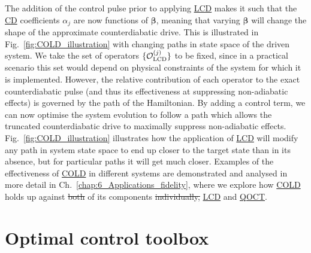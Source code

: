 \documentclass[a4paper,oneside,11pt]{book}
\newcommand{\betabb}{\boldsymbol{\beta}}
\newcommand{\acrref}[1]{\hyperref[acr:#1]{#1}}
\providecommand{\DIFaddtex}[1]{{\protect\color{blue}\uwave{#1}}} %
\providecommand{\DIFdeltex}[1]{{\protect\color{red}\sout{#1}}}                      %
\providecommand{\DIFaddbegin}{} %
\providecommand{\DIFaddend}{} %
\providecommand{\DIFdelbegin}{} %
\providecommand{\DIFdelend}{} %
\providecommand{\DIFadd}[1]{\texorpdfstring{\DIFaddtex{#1}}{#1}} %
\providecommand{\DIFdel}[1]{\texorpdfstring{\DIFdeltex{#1}}{}} %
\newcommand{\DIFscaledelfig}{0.5}
\newlength{\DIFdelgraphicswidth} %
\newlength{\DIFdelgraphicsheight} %
\newcommand{\DIFaddincludegraphics}[2][]{{\color{blue}\fbox{\DIFOincludegraphics[#1]{#2}}}} %
\newcommand{\DIFdelincludegraphics}[2][]{%
\sbox{\DIFdelgraphicsbox}{\DIFOincludegraphics[#1]{#2}}%
\settoboxwidth{\DIFdelgraphicswidth}{\DIFdelgraphicsbox} %
\settoboxtotalheight{\DIFdelgraphicsheight}{\DIFdelgraphicsbox} %
\scalebox{\DIFscaledelfig}{%
\parbox[b]{\DIFdelgraphicswidth}{\usebox{\DIFdelgraphicsbox}\\[-\baselineskip] \rule{\DIFdelgraphicswidth}{0em}}\llap{\resizebox{\DIFdelgraphicswidth}{\DIFdelgraphicsheight}{%
\setlength{\unitlength}{\DIFdelgraphicswidth}%
\begin{picture}(1,1)%
\thicklines\linethickness{2pt} %
{\color[rgb]{1,0,0}\put(0,0){\framebox(1,1){}}}%
{\color[rgb]{1,0,0}\put(0,0){\line( 1,1){1}}}%
{\color[rgb]{1,0,0}\put(0,1){\line(1,-1){1}}}%
\end{picture}%
}\hspace*{3pt}}} %
} %
\DeclareRobustCommand{\DIFaddbegin}{\DIFOaddbegin \let\includegraphics\DIFaddincludegraphics} %
\DeclareRobustCommand{\DIFaddend}{\DIFOaddend \let\includegraphics\DIFOincludegraphics} %
\DeclareRobustCommand{\DIFdelbegin}{\DIFOdelbegin \let\includegraphics\DIFdelincludegraphics} %
\DeclareRobustCommand{\DIFdelend}{\DIFOaddend \let\includegraphics\DIFOincludegraphics} %
\begin{document}
The addition of the control pulse prior to applying \acrref{LCD} makes it such that the \acrref{CD} coefficients $\alpha_j$ are now functions of $\betabb$, meaning that varying $\betabb$ will change the shape of the approximate counterdiabatic drive. This is illustrated in Fig.~\ref{fig:COLD_illustration} with changing paths in state space of the driven system. We take the set of operators \DIFdelbegin \DIFdel{$\{\mathcal{O}_{\rm LCD}^{(j)}\}$ }\DIFdelend \DIFaddbegin \DIFadd{$\mathcal{O}_{\rm LCD}$ }\DIFaddend to be fixed, since in a practical scenario this set would depend on physical constraints of the system for which it is implemented. However, the relative contribution of each operator to the exact counterdiabatic pulse (and thus its effectiveness at suppressing non-adiabatic effects) is governed by the path of the Hamiltonian. By adding a control term, we can now optimise the system evolution to follow a path which allows the truncated counterdiabatic drive to maximally suppress non-adiabatic effects. Fig.~\ref{fig:COLD_illustration} illustrates how the application of \acrref{LCD} will modify any path in system state space to end up closer to the target state than in its absence, but for particular paths it will get much closer. Examples of the effectiveness of \acrref{COLD} in different systems are demonstrated and analysed in more detail in Ch.~\ref{chap:6_Applications_fidelity}, where we explore how \acrref{COLD} holds up against \DIFdelbegin \DIFdel{both }\DIFdelend \DIFaddbegin \DIFadd{each }\DIFaddend of its components \DIFdelbegin \DIFdel{individually, }\DIFdelend \DIFaddbegin \DIFadd{on their own -- }\DIFaddend \acrref{LCD} and \acrref{QOCT}.

\section{Optimal control toolbox}\label{sec:4.2_COLD_QOCT}
\end{document}
